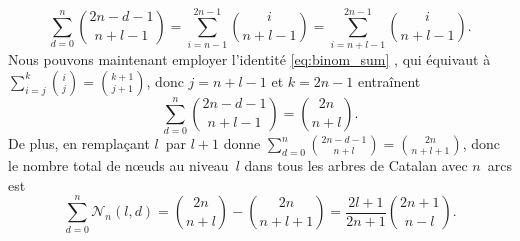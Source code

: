 \begin{equation*}
\sum_{d=0}^{n}\binom{2n-d-1}{n+l-1}
  = \sum_{i=n-1}^{2n-1}\binom{i}{n+l-1}
  = \sum_{i=n+l-1}^{2n-1}\binom{i}{n+l-1}.
\end{equation*}
Nous pouvons maintenant employer l'identité \eqref{eq:binom_sum}
, qui équivaut à \(\sum_{i=j}^{k}\binom{i}{j} =
\binom{k+1}{j+1}\), donc \(j=n+l-1\) et \(k=2n-1\) entraînent
\begin{equation*}
\sum_{d=0}^{n}\binom{2n-d-1}{n+l-1} = \binom{2n}{n+l}.
\end{equation*}
De plus, en remplaçant \(l\)~par \(l+1\) donne
\(\sum_{d=0}^{n}\binom{2n-d-1}{n+l} = \binom{2n}{n+l+1}\), donc le
nombre total de nœuds au niveau~\(l\) dans tous les arbres de
Catalan avec \(n\)~arcs est
\begin{equation}
\sum_{d=0}^{n}\mathcal{N}_n(l,d)
 = \binom{2n}{n+l} - \binom{2n}{n+l+1}
 = \frac{2l+1}{2n+1}\binom{2n+1}{n-l}.
\label{eq:N_n_l_d}
\end{equation}

